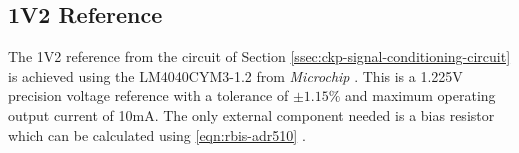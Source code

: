 	\subsection{1V2 Reference}\label{sssec:1v2-reference}

			The 1V2 reference from the circuit of Section \ref{ssec:ckp-signal-conditioning-circuit} is achieved using the LM4040CYM3-1.2 from \textit{Microchip} \cite{lm4040-datasheet}. This is a 1.225V precision voltage reference with a tolerance of $\pm 1.15\%$ and maximum operating output current of 10mA. The only external component needed is a bias resistor which can be calculated using \ref{eqn:rbis-adr510} \cite{lm4040-datasheet}.

